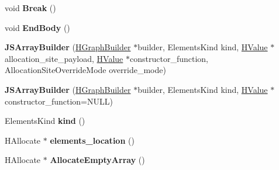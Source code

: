 \begin{DoxyCompactItemize}
\item 
\hypertarget{classv8_1_1internal_1_1_h_graph_builder_1_1_v8___f_i_n_a_l_ae525263a0acb09f592c8a0731882369b}{}void {\bfseries Break} ()\label{classv8_1_1internal_1_1_h_graph_builder_1_1_v8___f_i_n_a_l_ae525263a0acb09f592c8a0731882369b}

\item 
\hypertarget{classv8_1_1internal_1_1_h_graph_builder_1_1_v8___f_i_n_a_l_acb8a4bb03e6960c4d22d5c5f421d7e4e}{}void {\bfseries End\+Body} ()\label{classv8_1_1internal_1_1_h_graph_builder_1_1_v8___f_i_n_a_l_acb8a4bb03e6960c4d22d5c5f421d7e4e}

\item 
\hypertarget{classv8_1_1internal_1_1_h_graph_builder_1_1_v8___f_i_n_a_l_a883a3071cc9f45810c639eebc75c9285}{}{\bfseries J\+S\+Array\+Builder} (\hyperlink{classv8_1_1internal_1_1_h_graph_builder}{H\+Graph\+Builder} $\ast$builder, Elements\+Kind kind, \hyperlink{classv8_1_1internal_1_1_h_value}{H\+Value} $\ast$allocation\+\_\+site\+\_\+payload, \hyperlink{classv8_1_1internal_1_1_h_value}{H\+Value} $\ast$constructor\+\_\+function, Allocation\+Site\+Override\+Mode override\+\_\+mode)\label{classv8_1_1internal_1_1_h_graph_builder_1_1_v8___f_i_n_a_l_a883a3071cc9f45810c639eebc75c9285}

\item 
\hypertarget{classv8_1_1internal_1_1_h_graph_builder_1_1_v8___f_i_n_a_l_a5ccf20a5391f6d8eb5a214e2d09e9806}{}{\bfseries J\+S\+Array\+Builder} (\hyperlink{classv8_1_1internal_1_1_h_graph_builder}{H\+Graph\+Builder} $\ast$builder, Elements\+Kind kind, \hyperlink{classv8_1_1internal_1_1_h_value}{H\+Value} $\ast$constructor\+\_\+function=N\+U\+L\+L)\label{classv8_1_1internal_1_1_h_graph_builder_1_1_v8___f_i_n_a_l_a5ccf20a5391f6d8eb5a214e2d09e9806}

\item 
\hypertarget{classv8_1_1internal_1_1_h_graph_builder_1_1_v8___f_i_n_a_l_a9bd197262227b68e060bcb04d01acd2d}{}Elements\+Kind {\bfseries kind} ()\label{classv8_1_1internal_1_1_h_graph_builder_1_1_v8___f_i_n_a_l_a9bd197262227b68e060bcb04d01acd2d}

\item 
\hypertarget{classv8_1_1internal_1_1_h_graph_builder_1_1_v8___f_i_n_a_l_a591fccf71e50105af0b0c5c35f3d8b06}{}H\+Allocate $\ast$ {\bfseries elements\+\_\+location} ()\label{classv8_1_1internal_1_1_h_graph_builder_1_1_v8___f_i_n_a_l_a591fccf71e50105af0b0c5c35f3d8b06}

\item 
\hypertarget{classv8_1_1internal_1_1_h_graph_builder_1_1_v8___f_i_n_a_l_a7190888195b2ce483902fd1828574317}{}H\+Allocate $\ast$ {\bfseries Allocate\+Empty\+Array} ()\label{classv8_1_1internal_1_1_h_graph_builder_1_1_v8___f_i_n_a_l_a7190888195b2ce483902fd1828574317}


\end{DoxyCompactItemize}
